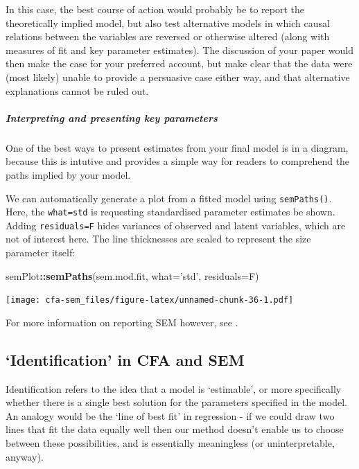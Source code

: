 \documentclass[]{article}
\newenvironment{Shaded}{\begin{snugshade}}{\end{snugshade}}
\newcommand{\DataTypeTok}[1]{\textcolor[rgb]{0.13,0.29,0.53}{#1}}
\newcommand{\KeywordTok}[1]{\textcolor[rgb]{0.13,0.29,0.53}{\textbf{#1}}}
\newcommand{\NormalTok}[1]{#1}
\newcommand{\OperatorTok}[1]{\textcolor[rgb]{0.81,0.36,0.00}{\textbf{#1}}}
\newcommand{\StringTok}[1]{\textcolor[rgb]{0.31,0.60,0.02}{#1}}
\let\oldsubparagraph\subparagraph
\renewcommand{\subparagraph}[1]{\oldsubparagraph{#1}\mbox{}}
\begin{document}
In this case, the best course of action would probably be to report the
theoretically implied model, but also test alternative models in which causal
relations between the variables are reversed or otherwise altered (along with
measures of fit and key parameter estimates). The discussion of your paper would
then make the case for your preferred account, but make clear that the data were
(most likely) unable to provide a persuasive case either way, and that
alternative explanations cannot be ruled out.

\hypertarget{interpreting-and-presenting-key-parameters}{%
\subparagraph{Interpreting and presenting key parameters}\label{interpreting-and-presenting-key-parameters}}

One of the best ways to present estimates from your final model is in a diagram,
because this is intutive and provides a simple way for readers to comprehend the
paths implied by your model.

We can automatically generate a plot from a fitted model using \texttt{semPaths()}.
Here, the \texttt{what=\textquotesingle{}std\textquotesingle{}} is requesting standardised parameter estimates be shown.
Adding \texttt{residuals=F} hides variances of observed and latent variables, which are
not of interest here. The line thicknesses are scaled to represent the size
parameter itself:

\begin{Shaded}
\begin{Highlighting}[]
\NormalTok{semPlot}\OperatorTok{::}\KeywordTok{semPaths}\NormalTok{(sem.mod.fit, }\DataTypeTok{what=}\StringTok{'std'}\NormalTok{, }\DataTypeTok{residuals=}\NormalTok{F)}
\end{Highlighting}
\end{Shaded}

\texttt{[image: cfa-sem\_files/figure-latex/unnamed-chunk-36-1.pdf]}

For more information on reporting SEM however, see \citet{schreiber2006reporting}.

\hypertarget{identification}{%
\subsection*{`Identification' in CFA and SEM}\label{identification}}

Identification refers to the idea that a model is `estimable', or more
specifically whether there is a single best solution for the parameters
specified in the model. An analogy would be the `line of best fit' in
regression - if we could draw two lines that fit the data equally well then our
method doesn't enable us to choose between these possibilities, and is
essentially meaningless (or uninterpretable, anyway).
\end{document}
